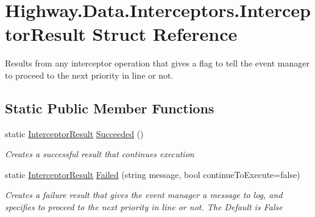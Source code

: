 \hypertarget{struct_highway_1_1_data_1_1_interceptors_1_1_interceptor_result}{\section{Highway.\-Data.\-Interceptors.\-Interceptor\-Result Struct Reference}
\label{struct_highway_1_1_data_1_1_interceptors_1_1_interceptor_result}
}


Results from any interceptor operation that gives a flag to tell the event manager to proceed to the next priority in line or not.  


\subsection*{Static Public Member Functions}
\begin{DoxyCompactItemize}
\item 
static \hyperlink{struct_highway_1_1_data_1_1_interceptors_1_1_interceptor_result}{Interceptor\-Result} \hyperlink{struct_highway_1_1_data_1_1_interceptors_1_1_interceptor_result_a0375f8caa602575e5574f505341f9ea5}{Succeeded} ()
\begin{DoxyCompactList}\small\item\em Creates a successful result that continues execution \end{DoxyCompactList}\item 
static \hyperlink{struct_highway_1_1_data_1_1_interceptors_1_1_interceptor_result}{Interceptor\-Result} \hyperlink{struct_highway_1_1_data_1_1_interceptors_1_1_interceptor_result_a54a35f1060e308ef40ecc189f7d9543a}{Failed} (string message, bool continue\-To\-Execute=false)
\begin{DoxyCompactList}\small\item\em Creates a failure result that gives the event manager a message to log, and specifies to proceed to the next priority in line or not. The Default is False \end{DoxyCompactList}\end{DoxyCompactItemize}
